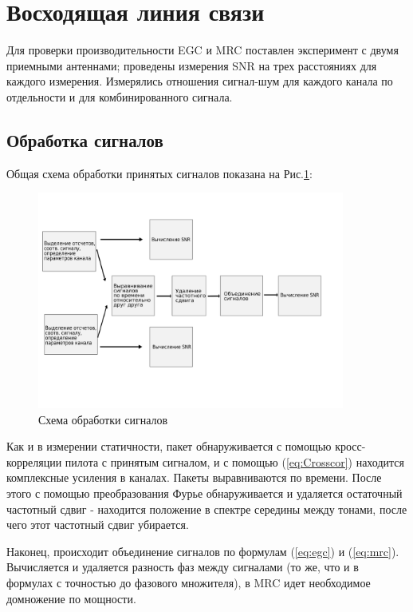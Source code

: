 \documentclass[a4paper,12pt,oneside]{scrartcl}
\begin{document}
\section{Восходящая линия связи}

Для проверки производительности EGC и MRC поставлен эксперимент с двумя приемными антеннами; проведены измерения SNR на трех расстояниях для каждого измерения. 
Измерялись отношения сигнал-шум для каждого канала по отдельности и для комбинированного сигнала.

\subsection{Обработка сигналов}

Общая схема обработки принятых сигналов показана на Рис.\ref{fig:SignalProcessing}:

\begin{figure}[!htb]
    \centering
    \includegraphics[width=0.9\textwidth]{pics/signalprocessing.png}
    \caption{Схема обработки сигналов}
    \label{fig:SignalProcessing}
\end{figure}

Как и в измерении статичности, пакет обнаруживается с помощью кросс-корреляции пилота с принятым сигналом, и с помощью (\ref{eq:Crosscor}) находится комплексные усиления в каналах. Пакеты выравниваются по времени.
После этого с помощью преобразования Фурье обнаруживается и удаляется остаточный частотный сдвиг - находится положение в спектре середины между тонами, после чего этот частотный сдвиг убирается.

Наконец, происходит объединение сигналов по формулам (\ref{eq:egc}) и (\ref{eq:mrc}). Вычисляется и удаляется разность фаз между сигналами (то же, что и в формулах с точностью до фазового множителя), в MRC идет необходимое домножение по мощности.
\end{document}
